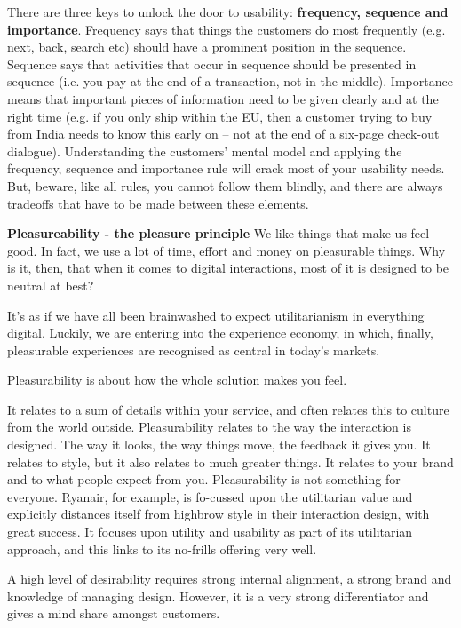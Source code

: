 There are three keys to unlock the door to usability: \textbf{frequency, sequence and importance}. Frequency says that things the customers do most frequently (e.g. next, back, search etc) should have a prominent position in the sequence. Sequence says that activities that occur in sequence should be presented in sequence (i.e. you pay at the end of a transaction, not in the middle). Importance means that important pieces of information need to be given clearly and at the right time (e.g. if you only ship within the EU, then a customer trying to buy from India needs to know this early on – not at the end of a six-page check-out dialogue). Understanding the customers’ mental model and applying the frequency, sequence and importance rule will crack most of your usability needs. But, beware, like all rules, you cannot follow them blindly, and there are always tradeoffs that have to be made between these elements.

\textbf{Pleasureability - the pleasure principle}
We like things that make us feel good. In fact, we use a lot of time, effort and money on pleasurable things. Why is it, then, that when it comes to digital interactions, most of it is designed to be neutral at best?

It’s as if we have all been brainwashed to expect utilitarianism in everything digital. Luckily, we are entering into the experience economy, in which, finally, pleasurable experiences are recognised as central in today’s markets.

Pleasurability is about how the whole solution makes you feel.


It relates to a sum of details within your service, and often relates this to culture from the world outside. Pleasurability relates to the way the interaction is designed. The way it looks, the way things move, the feedback it gives you. It relates to style, but it also relates to much greater things. It relates to your brand and to what people expect from you. Pleasurability is not something for everyone. Ryanair, for example, is fo-cussed upon the utilitarian value and explicitly distances itself from highbrow style in their interaction design, with great success. It focuses upon utility and usability as part of its utilitarian approach, and this links to its no-frills offering very well.

A high level of desirability requires strong internal alignment, a strong brand and knowledge of managing design. However, it is a very strong differentiator and gives a mind share amongst customers.

